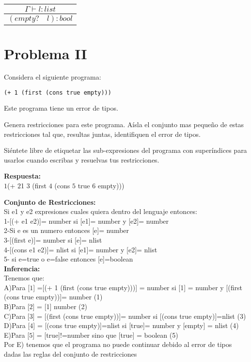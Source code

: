 \documentclass{article}
\begin{document}
\begin{center}
 \begin{longtable}{c}
 $\Gamma \vdash l:list$ \\ \hline
 $(empty? \quad l):bool$ \\
\end{longtable}

\end{center}

\section*{Problema II}
Considera el siguiente programa:

\begin{verbatim}
(+ 1 (first (cons true empty)))
\end{verbatim}

Este programa tiene un error de tipos.

Genera restricciones para este programa. Aísla el conjunto mas pequeño de
estas restricciones tal que, resultas juntas, identifiquen el error de tipos.

Siéntete libre de etiquetar las sub-expresiones del programa con superíndices
para usarlos cuando escribas y resuelvas tus restricciones.

\textbf {Respuesta: }
\\
$\boxed{1}$(+ $\boxed{2}$1  $\boxed{3}$ (first $\boxed{4}$ (cons $\boxed{5}$ true $\boxed{6}$ empty)))

\textbf {Conjunto de Restricciones: }
\\
Si e1 y e2 expresiones cuales quiera dentro del lenguaje entonces:
 \\
 1-[(+ e1 e2)]= number si [e1]= number y [e2]= number
 \\
 2-Si e es un numero entonces [e]= number
 \\
 3-[(first e)]= number si [e]= nlist
 \\
 4-[(cons e1 e2)]= nlist si [e1]= number y [e2]= nlist
 \\
 5- si e=true o e=false entonces [e]=boolean 
 \\
\textbf{Inferencia: }
  \\
  Tenemos que: 
  \\
  A)Para [$\boxed{1}$] =[(+ 1 (first (cons true empty)))] = number si [1] = number y [(first (cons true empty))]= number (1)\\ 
  B)Para [$\boxed{2}$] = [1] number (2)\\
  C)Para [$\boxed{3}$] = [(first (cons true empty))]= number si [(cons true empty)]=nlist (3)\\
  D)Para [$\boxed{4}$] = [(cons true empty)]=nlist si [true]= number y [empty] = nlist (4)\\
  E)Para [$\boxed{5}$] = [true]!=number sino que [true] = boolean (5)\\
  Por E) tenemos que el programa no puede continuar debido al error de tipos dadas las reglas del conjunto de restricciones
    
\end{document}
